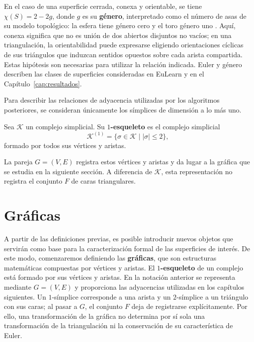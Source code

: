 En el caso de una superficie cerrada, conexa y orientable, se tiene $\chi(S)=2-2g$, donde $g$ es su \textbf{género}, interpretado como el número de asas de su modelo topológico: la esfera tiene género cero y el toro género uno \cite{munkres_topology_2000}. Aquí, conexa significa que no es unión de dos abiertos disjuntos no vacíos; en una triangulación, la orientabilidad puede expresarse eligiendo orientaciones cíclicas de sus triángulos que induzcan sentidos opuestos sobre cada arista compartida. Estas hipótesis son necesarias para utilizar la relación indicada. Euler y género describen las clases de superficies consideradas en EuLearn \cite{2025eulearn} y en el Capítulo~\ref{cap:resultados}.

Para describir las relaciones de adyacencia utilizadas por los algoritmos posteriores, se consideran únicamente los símplices de dimensión a lo más uno.

\begin{definition}[$1$-esqueleto]
\label{def:uno-esqueleto}
Sea $\mathcal{K}$ un complejo simplicial. Su \textbf{$1$-esqueleto} es el complejo simplicial
\[
\mathcal{K}^{(1)}=\{\sigma\in\mathcal{K}\mid |\sigma|\leq2\},
\]
formado por todos sus vértices y aristas.
\end{definition}

La pareja $G=(V,E)$ registra estos vértices y aristas y da lugar a la gráfica que se estudia en la siguiente sección. A diferencia de $\mathcal{K}$, esta representación no registra el conjunto $F$ de caras triangulares.

\section{Gráficas}
A partir de las definiciones previas, es posible introducir nuevos objetos que servirán como base para la caracterización formal de las superficies de interés. De este modo, comenzaremos definiendo las \textbf{gráficas}, que son estructuras matemáticas compuestas por vértices y aristas. El \textbf{$1$-esqueleto} de un complejo está formado por sus vértices y aristas. En la notación anterior se representa mediante $G=(V,E)$ y proporciona las adyacencias utilizadas en los capítulos siguientes. Un $1$-símplice corresponde a una arista y un $2$-símplice a un triángulo con sus caras; al pasar a $G$, el conjunto $F$ deja de registrarse explícitamente. Por ello, una transformación de la gráfica no determina por sí sola una transformación de la triangulación ni la conservación de su característica de Euler.

